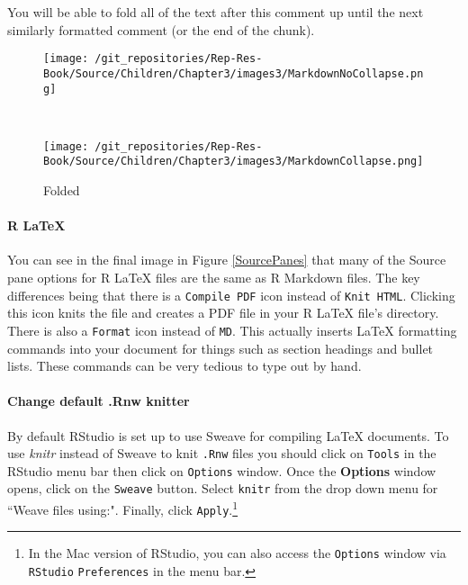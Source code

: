 \noindent You will be able to fold all of the text after this comment up until the next similarly formatted comment (or the end of the chunk).

\begin{figure}[ht!]
    \caption{Folding Code Chunks in RStudio}
    \label{CodeFold}
    \begin{center}
    \begin{subfigure}  
        \caption{Not Folded}   \texttt{[image: /git\_repositories/Rep-Res-Book/Source/Children/Chapter3/images3/MarkdownNoCollapse.png]}
    \end{subfigure} \\[0.5cm]
    
    \begin{subfigure}
        \caption{Folded}
      \texttt{[image: /git\_repositories/Rep-Res-Book/Source/Children/Chapter3/images3/MarkdownCollapse.png]}        
    \end{subfigure}
    \end{center}
\end{figure}

\paragraph{R LaTeX}

You can see in the final image in Figure \ref{SourcePanes} that many of the Source pane options for R LaTeX files are the same as R Markdown files. The key differences being that there is a \texttt{Compile PDF} icon instead of \texttt{Knit HTML}. Clicking this icon knits the file and creates a PDF file in your R LaTeX file's directory. There is also a \texttt{Format} icon instead of \texttt{MD}. This actually inserts LaTeX formatting commands into your document for things such as section headings and bullet lists. These commands can be very tedious to type out by hand.


\paragraph{Change default .Rnw knitter}

By default RStudio is set up to use Sweave for compiling LaTeX documents. To use {\emph{knitr}} instead of Sweave to knit \texttt{.Rnw} files you should click on \texttt{Tools} in the RStudio menu bar then click on \texttt{Options} window. Once the {\bf{Options}} window opens, click on the \texttt{Sweave} button. Select \texttt{knitr} from the drop down menu for ``Weave files using:". Finally, click \texttt{Apply}.\footnote{In the Mac version of RStudio, you can also access the \texttt{Options} window via \texttt{RStudio} \textrightarrow \texttt{Preferences} in the menu bar.} 

